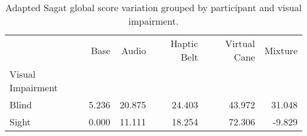 
\begin{table}[!htb]
\centering
\caption{Adapted Sagat global score variation grouped by participant and visual impairment.}
\label{tab:sagat_var_average_group}
\begin{tabular}{lrrrrr}
\toprule
{} &  Base &  Audio &  Haptic Belt &  Virtual Cane &  Mixture \\
Visual Impairment &       &        &              &               &          \\
\midrule
Blind             & 5.236 & 20.875 &       24.403 &        43.972 &   31.048 \\
Sight             & 0.000 & 11.111 &       18.254 &        72.306 &   -9.829 \\
\bottomrule
\end{tabular}
\end{table}

